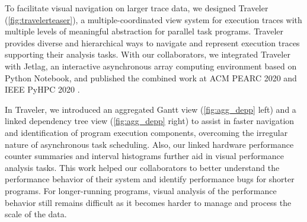 \begin{refsection}


To facilitate visual navigation on larger trace data, we designed Traveler (\autoref{fig:travelerteaser}), a multiple-coordinated view system for execution traces with multiple levels of meaningful abstraction for parallel task programs. Traveler provides diverse and hierarchical ways to navigate and represent execution traces supporting their analysis tasks. With our collaborators, we integrated Traveler with Jetlag, an interactive asynchronous array computing environment based on Python Notebook, and published the combined work at ACM PEARC 2020 \cite{brandt2020jetlag} and IEEE PyHPC 2020 \cite{brandt2020distributed}.

In Traveler, we introduced an aggregated Gantt view (\autoref{fig:agg_depp} left) and a linked dependency tree view (\autoref{fig:agg_depp} right) to assist in faster navigation and identification of program execution components, overcoming the irregular nature of asynchronous task scheduling. Also, our linked hardware performance counter summaries and interval histograms further aid in visual performance analysis tasks. This work helped our collaborators to better understand the performance behavior of their system and identify performance bugs for shorter programs. For longer-running programs, visual analysis of the performance behavior still remains difficult as it becomes harder to manage and process the scale of the data.


\end{refsection}
